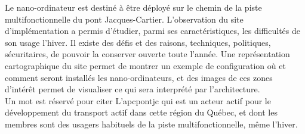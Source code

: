 ﻿\noindent Le nano-ordinateur est destiné à être déployé sur le chemin de la piste multifonctionnelle du pont Jacques-Cartier. L'observation du site d'implémentation a permis d'étudier, parmi ses caractéristiques, les difficultés de son usage l'hiver. Il existe des défis et des raisons, techniques, politiques, sécuritaires, de pouvoir la conserver ouverte toute l'année. Une représentation cartographique du site permet de montrer un exemple de configuration où et comment seront installés les nano-ordinateurs, et des images de ces zones d'intérêt permet de visualiser ce qui sera interprété par l'architecture. 
\vspace{\baselineskip}
\\
\noindent Un mot est réservé pour citer L'\acrlong{apcpontjc} qui est un acteur actif pour le développement du transport actif dans cette région du Québec, et dont les membres sont des usagers habituels de la piste multifonctionnelle, même l'hiver.